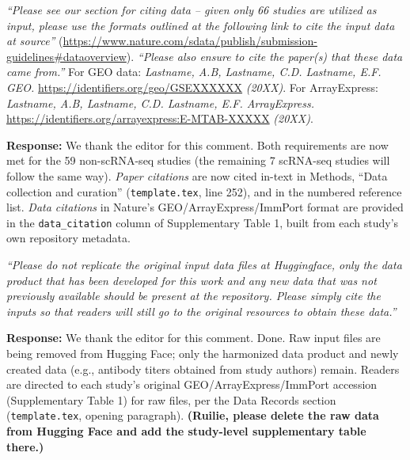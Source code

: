 \documentclass[11pt]{article}
\newcommand{\origcomment}[1]{\textit{``#1''}}
\newcommand{\filledresponse}[1]{%
  \par\medskip\noindent\textbf{Response:} #1\par
  \vspace{0.4cm}%
  \par\noindent\hrulefill\par\bigskip
}
\begin{document}
\begin{commentlist}
\item[E8.] \origcomment{Please see our section for citing data -- given only 66 studies are
utilized as input, please use the formats outlined at the following link to cite the input data
at source} (\url{https://www.nature.com/sdata/publish/submission-guidelines#dataoverview}).
\origcomment{Please also ensure to cite the paper(s) that these data came from.}
For GEO data: \textit{Lastname, A.B, Lastname, C.D. Lastname, E.F. GEO.}
\url{https://identifiers.org/geo/GSEXXXXXX} \textit{(20XX)}. For ArrayExpress:
\textit{Lastname, A.B, Lastname, C.D. Lastname, E.F. ArrayExpress.}
\url{https://identifiers.org/arrayexpress:E-MTAB-XXXXX} \textit{(20XX)}.
\filledresponse{We thank the editor for this comment. Both requirements are now met for the 59 non-scRNA-seq studies (the remaining 7
scRNA-seq studies will follow the same way). \emph{Paper citations} are now cited in-text in
Methods, ``Data collection and curation'' (\texttt{template.tex}, line 252), and in the numbered
reference list. \emph{Data citations} in Nature's GEO/ArrayExpress/ImmPort format are provided in
the \texttt{data\_citation} column of Supplementary Table 1, built from each study's own repository
metadata.}

\item[E9.] \origcomment{Please do not replicate the original input data files at Huggingface, only
the data product that has been developed for this work and any new data that was not previously
available should be present at the repository. Please simply cite the inputs so that readers will
still go to the original resources to obtain these data.}
\filledresponse{We thank the editor for this comment. Done. Raw input files are being removed from Hugging Face; only the harmonized data
product and newly created data (e.g., antibody titers obtained from study authors) remain.
Readers are directed to each study's original GEO/ArrayExpress/ImmPort accession (Supplementary
Table 1) for raw files, per the Data Records section (\texttt{template.tex}, opening paragraph).
\textbf{(Ruilie, please delete the raw data from Hugging Face and add the study-level supplementary
table there.)}}


\end{commentlist}
\end{document}

